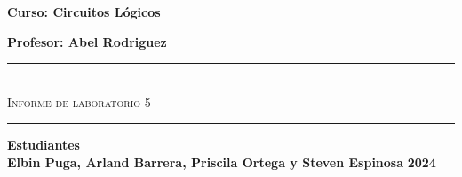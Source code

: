 \begin{titlepage}
\begin{center}
        {\Large \textbf{Curso: Circuitos Lógicos}}\medskip
        
        {\Large \textbf{Profesor: Abel Rodriguez}}

        \rule{\linewidth}{0.75mm}\\

            {\Large \textsc{Informe de laboratorio 5}} 
        \rule{\linewidth}{0.75mm}\medskip

        {\Large \textbf{Estudiantes}}\\
        \vspace{5mm}
        {\Large \textbf{Elbin Puga, Arland Barrera, Priscila Ortega y Steven Espinosa}}
        \vfill
        {\Huge \textbf{2024}}

    \end{center}
\end{titlepage}